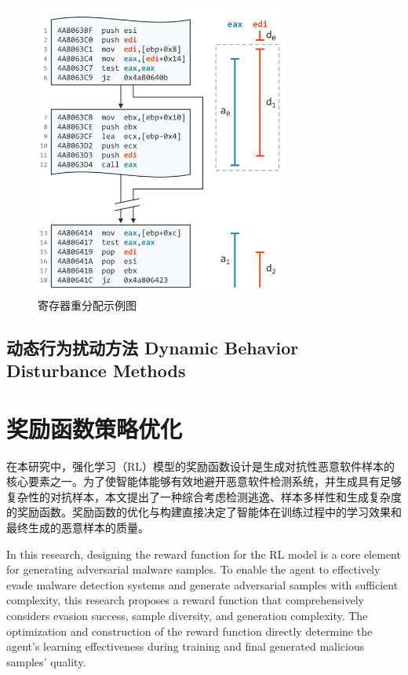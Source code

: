 \begin{figure}[hbt]
	\centering
	\includegraphics[width=0.75\textwidth]{figures/4.6}
	\caption{寄存器重分配示例图}\label{fig:4.6}
\end{figure}

\subsection{动态行为扰动方法 Dynamic Behavior Disturbance Methods}

\section{奖励函数策略优化}


在本研究中，强化学习（RL）模型的奖励函数设计是生成对抗性恶意软件样本的核心要素之一。为了使智能体能够有效地避开恶意软件检测系统，并生成具有足够复杂性的对抗样本，本文提出了一种综合考虑检测逃逸、样本多样性和生成复杂度的奖励函数。奖励函数的优化与构建直接决定了智能体在训练过程中的学习效果和最终生成的恶意样本的质量。

In this research, designing the reward function for the RL model is a core element for generating adversarial malware samples. To enable the agent to effectively evade malware detection systems and generate adversarial samples with sufficient complexity, this research proposes a reward function that comprehensively considers evasion success, sample diversity, and generation complexity. The optimization and construction of the reward function directly determine the agent's learning effectiveness during training and final generated malicious samples' quality.

